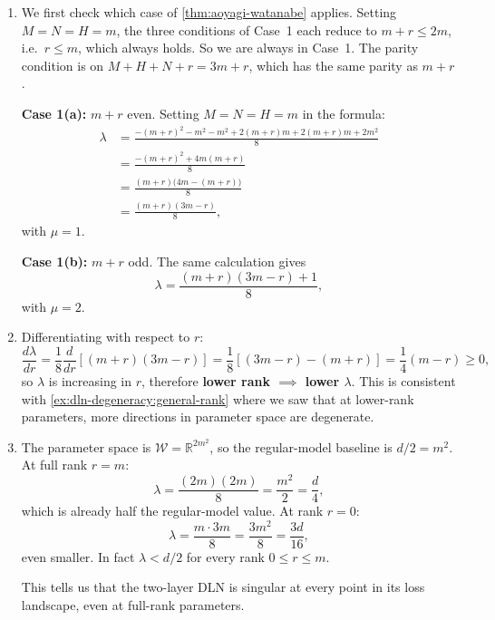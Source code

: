 \documentclass[11pt]{article}
\newcommand{\R}{\mathbb{R}}
\newcommand{\W}{\mathcal{W}}
\begin{document}
\begin{solution}[ex:dln-lc]
\begin{enumerate}
    \item
        We first check which case of \cref{thm:aoyagi-watanabe} applies.
        Setting $M = N = H = m$, the three conditions of Case~1 each reduce to
        $m + r \leq 2m$, i.e.\ $r \leq m$, which always holds. So we are always
        in Case~1. The parity condition is on $M + H + N + r = 3m + r$, which
        has the same parity as $m + r$.

        \textbf{Case 1(a):} $m + r$ even. Setting $M = N = H = m$ in the
        formula:
        \begin{align*}
            \lambda
            &= \frac{-(m+r)^2 - m^2 - m^2 + 2(m+r)m + 2(m+r)m + 2m^2}{8} \\
            &= \frac{-(m+r)^2 + 4m(m+r)}{8} \\
            &= \frac{(m+r)\bigl(4m - (m+r)\bigr)}{8} \\
            &= \frac{(m+r)(3m-r)}{8},
        \end{align*}
        with $\mu = 1$.

        \textbf{Case 1(b):} $m + r$ odd. The same calculation gives
        \[
            \lambda = \frac{(m+r)(3m - r) + 1}{8},
        \]
        with $\mu = 2$.

    \item
         Differentiating with respect to $r$:
        \[
            \frac{d\lambda}{dr}=\frac{1}{8}\frac{d}{dr}\!\left[(m+r)(3m-r)\right]
            = \frac{1}{8}\left[(3m - r) - (m + r)\right] = \frac{1}{4}(m - r) \geq 0,
        \]
        so $\lambda$ is increasing in $r$, therefore \textbf{lower rank
        $\implies$ lower $\lambda$}. This is consistent with
        \cref{ex:dln-degeneracy:general-rank} where we saw that at lower-rank
        parameters, more directions in parameter space are degenerate.

    \item
        The parameter space is $\W = \R^{2m^2}$, so the regular-model baseline
        is $d/2 = m^2$. At full rank $r = m$:
        \[
            \lambda = \frac{(2m)(2m)}{8} = \frac{m^2}{2} = \frac{d}{4},
        \]
        which is already half the regular-model value. At rank $r = 0$:
        \[
            \lambda = \frac{m \cdot 3m}{8} = \frac{3m^2}{8} = \frac{3d}{16},
        \]
        even smaller. In fact $\lambda < d/2$ for every rank $0 \leq r \leq m$.

        This tells us that the two-layer DLN is singular at every point in its
        loss landscape, even at full-rank parameters.
\end{enumerate}
\end{solution}
\end{document}
